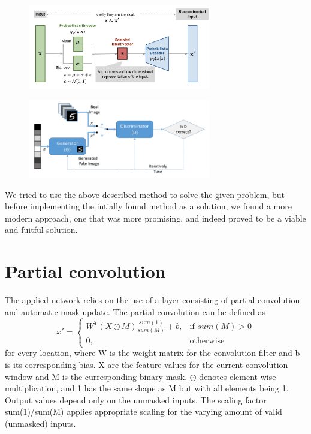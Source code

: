 \documentclass[conference]{IEEEtran}
\begin{document}
\begin{figure}
  \centering
  \includegraphics[width=80mm, keepaspectratio]{figures/vae-gaussian.png}
\end{figure}

\begin{figure}
  \centering
  \includegraphics[width=80mm, keepaspectratio]{figures/GAN_basic_flow.png}
\end{figure}

We tried to use the above described method to solve the given problem, but before implementing the intially found method as a solution, we found a more modern approach, one that was more promising, and indeed proved to be a viable and fuitful solution.

\section{Partial convolution}
The applied network relies on the use of a layer consisting of partial convolution and automatic mask update.
The partial convolution can be defined as
\begin{equation}
{x}' = \begin{cases}
W^T(X \odot M) \frac{sum(1)}{sum(M)} + b, & \text{if } sum(M) > 0 \\
0, & \text{otherwise}
\end{cases}
\end{equation}
for every location, where W is the weight matrix for the convolution filter and b is its corresponding bias. X are the feature values for the current convolution window and M is the curresponding binary mask.
$\odot$ denotes element-wise multiplication, and 1 has the same shape as M but with all elements being 1. Output values depend only on the unmasked inputs. The scaling factor sum(1)/sum(M) applies appropriate scaling for the varying amount of valid (unmasked) inputs.
\end{document}
